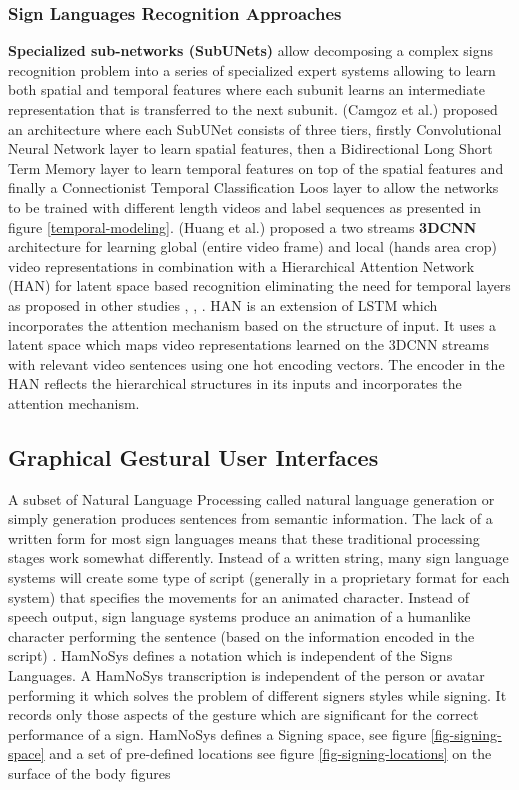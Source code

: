 \subsubsection{Sign Languages Recognition Approaches}
\textbf{Specialized sub-networks (SubUNets)} allow decomposing a complex signs recognition problem into a series of specialized expert systems allowing to learn both spatial and temporal features where each subunit learns an intermediate representation that is transferred to the next subunit. (Camgoz et al.) \cite{camgoz2017subunets} proposed an architecture where each SubUNet consists of three tiers, firstly Convolutional Neural Network layer to learn spatial features, then a Bidirectional Long Short Term Memory layer to learn temporal features on top of the spatial features and finally a Connectionist Temporal Classification Loos layer to allow the networks to be trained with different length videos and label sequences as presented in figure \ref{temporal-modeling}. (Huang et al.) \cite{huang2018videobased} proposed a two streams \textbf{3DCNN} architecture for learning global (entire video frame) and local (hands area crop) video representations in combination with a Hierarchical Attention Network (HAN) for latent space based recognition eliminating the need for temporal layers as proposed in other studies \cite{slimane2021context}, \cite{camgoz2017subunets}, \cite{camgoz2020sign}. HAN is an extension of LSTM which incorporates the attention mechanism based on the structure of input. It uses a latent space which maps video representations learned on the 3DCNN streams with relevant video sentences using one hot encoding vectors. The encoder in the HAN reflects the hierarchical structures in its inputs and incorporates the attention mechanism.

\subsection{Graphical Gestural User Interfaces}
A subset of Natural Language Processing called natural language generation or simply generation produces sentences from semantic information. The lack of a written form for most sign languages means that these traditional processing stages work somewhat differently. Instead of a written string, many sign language systems will create some type of script (generally in a proprietary format for each system) that specifies the movements for an animated character. Instead of speech output, sign language systems produce an animation of a humanlike character performing the sentence (based on the information encoded in the script) \cite{huenerfauth2009sign}. HamNoSys defines a notation which is independent of the Signs Languages. A HamNoSys transcription is independent of the person or avatar performing it which solves the problem of different signers styles while signing. It records only those aspects of the gesture which are significant for the correct performance of a sign. HamNoSys defines a Signing space, see figure \ref{fig-signing-space} and a set of pre-defined locations see figure \ref{fig-signing-locations} on the surface of the body figures \cite{kennaway2015avatar}

